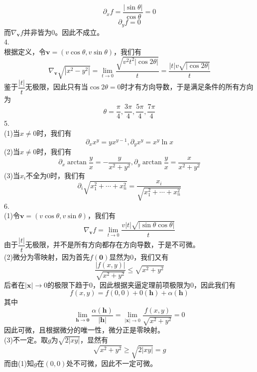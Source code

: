 \documentclass[utf8]{ctexart}
\newcommand{\bm}[1]{\boldsymbol{#1}}
\begin{document}
\[\partial_xf=\frac{|\sin\theta|}{\cos\theta}=0\]
\[\partial_yf=0\]
而$\nabla_{\bm{v}}f$并非皆为$0$。因此不成立。\\
4.\\
根据定义，令$\bm{v}=(v\cos\theta,v\sin\theta)$，我们有
\[\nabla_{\bm{v}}\sqrt{|x^2-y^2|}=\lim_{t\rightarrow0}\frac{\sqrt{v^2t^2|\cos2\theta|}}{t}=\frac{|t|v\sqrt{|\cos2\theta|}}{t}\]
鉴于$\dfrac{|t|}{t}$无极限，因此只有当$\cos2\theta=0$时才有方向导数，于是满足条件的所有方向为
\[\theta=\frac{\pi}{4},\frac{3\pi}{4},\frac{5\pi}{4},\frac{7\pi}{4}\]
5.\\
(1)当$x\neq0$时，我们有
\[\partial_xx^y=yx^{y-1},\partial_yx^y=x^y\ln x\]
(2)当$x\neq0$时，我们有
\[\partial_x\arctan\frac{y}{x}=-\frac{y}{x^2+y^2},\partial_y\arctan\frac{y}{x}=\frac{x}{x^2+y^2}\]
(3)当$x_i$不全为$0$时，我们有
\[\partial_i\sqrt{x_1^2+\cdots+x_n^2}=\frac{x_i}{\sqrt{x_1^2+\cdots+x_n^2}}\]
6.\\
(1)令$\bm{v}=(v\cos\theta,v\sin\theta)$，我们有
\[\nabla_{\bm{v}}f=\lim_{t\rightarrow0}\frac{v|t|\sqrt{|\sin\theta\cos\theta|}}{t}\]
由于$\dfrac{|t|}{t}$无极限，并不是所有方向都存在方向导数，于是不可微。\\
(2)微分为零映射，因为首先$f(\bm{0})$显然为$0$，我们又有
\[\frac{|f(x,y)|}{\sqrt{x^2+y^2}}\le\sqrt{x^2+y^2}\]
后者在$|\bm{x}|\rightarrow0$的极限下趋于$0$，因此根据夹逼定理前项极限为$0$，因此我们有
\[f(x,y)=f(0,0)+0(\bm{h})+\alpha(\bm{h})\]
其中
\[\lim_{\bm{h}\rightarrow\bm{0}}\frac{\alpha(\bm{h})}{|\bm{h}|}=\lim_{|\bm{x}|\rightarrow0}\frac{f(x,y)}{\sqrt{x^2+y^2}}=0\]
因此可微，且根据微分的唯一性，微分正是零映射。\\
(3)不一定。取$g$为$\sqrt{2|xy|}$，显然有
\[\sqrt{x^2+y^2}\ge\sqrt{2|xy|}=g\]
而由(1)知$g$在$(0,0)$处不可微，因此不一定可微。
\end{document}
